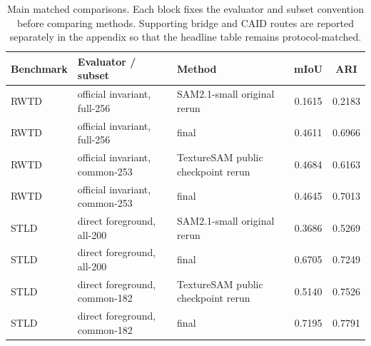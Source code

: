 \begin{table}[t]
\centering
\scriptsize
\setlength{\tabcolsep}{5pt}
\renewcommand{\arraystretch}{0.98}
\begin{tabularx}{\textwidth}{@{}p{}p{}Xcc@{}}
\toprule
Benchmark & Evaluator / subset & Method & mIoU & ARI \\
\midrule
RWTD & official invariant, full-256 & SAM2.1-small original rerun~\cite{ravi2024sam2} & 0.1615 & 0.2183 \\
RWTD & official invariant, full-256 & \sys{} final & 0.4611 & 0.6966 \\
RWTD & official invariant, common-253 & TextureSAM public checkpoint rerun~\cite{texturesamrepo2026} & 0.4684 & 0.6163 \\
RWTD & official invariant, common-253 & \sys{} final & 0.4645 & 0.7013 \\
\midrule
STLD & direct foreground, all-200 & SAM2.1-small original rerun~\cite{ravi2024sam2} & 0.3686 & 0.5269 \\
STLD & direct foreground, all-200 & \sys{} final & 0.6705 & 0.7249 \\
STLD & direct foreground, common-182 & TextureSAM public checkpoint rerun~\cite{texturesamrepo2026} & 0.5140 & 0.7526 \\
STLD & direct foreground, common-182 & \sys{} final & 0.7195 & 0.7791 \\
\bottomrule
\end{tabularx}
\caption{Main matched comparisons. Each block fixes the evaluator and subset convention before comparing methods. Supporting bridge and CAID routes are reported separately in the appendix so that the headline table remains protocol-matched.}
\label{tab:proposal_results}
\end{table}

